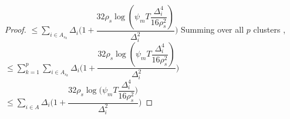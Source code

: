 \begin{proof}
\newline
\hspace*{12em}
$\leq\sum_{i\in A_{s_{k}}}\Delta_{i}\bigg(1+\dfrac{32\rho_{s}\log{(\psi_{m}T\dfrac{\Delta_{i}^{4}}{16\rho_{s}^{2}})}}{\Delta_{i}^{2}}\bigg)$
\newline
Summing over all $p$ clusters ,
\newline
\hspace*{4em}$\leq\sum_{k=1}^{p}\sum_{i\in A_{s_{k}}}\Delta_{i}\bigg(1+\dfrac{32\rho_{s}\log{(\psi_{m}T\dfrac{\Delta_{i}^{4}}{16\rho_{s}^{2}})}}{\Delta_{i}^{2}}\bigg)$
\newline
\hspace*{4em}$\leq\sum_{i\in A}\Delta_{i}\bigg(1+\dfrac{32\rho_{s}\log{(\psi_{m}T\dfrac{\Delta_{i}^{4}}{16\rho_{s}^{2}}})}{\Delta_{i}^{2}}\bigg)$
\newline


\end{proof}
